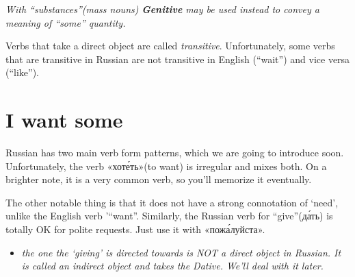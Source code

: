 \emph{With ``substances''(mass nouns)} \textbf{\emph{Genitive}}
\emph{may be used instead to convey a meaning of ``some'' quantity.}

Verbs that take a direct object are called \emph{transitive}.
Unfortunately, some verbs that are transitive in Russian are not
transitive in English (``wait'') and vice versa (``like'').

\section{I want some}\label{i-want-some}

Russian has two main verb form patterns, which we are going to introduce
soon. Unfortunately, the verb «хот\'{е}ть»(to want) is irregular and mixes
both. On a brighter note, it is a very common verb, so you'll memorize
it eventually.

The other notable thing is that it does not have a strong connotation of
`need', unlike the English verb '``want''. Similarly, the Russian verb
for ``give''(д\'{а}ть) is totally OK for polite requests. Just use it with
«пож\'{а}луйста».

\begin{itemize}
\tightlist
\item
  \emph{the one the `giving' is directed towards is NOT a direct object
  in Russian. It is called an indirect object and takes the Dative.
  We'll deal with it later.}
\end{itemize}
